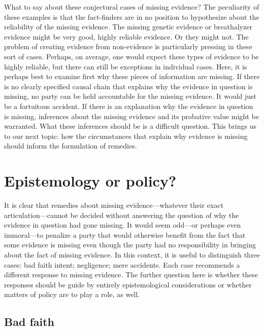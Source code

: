 \documentclass[
  10pt,
  dvipsnames,enabledeprecatedfontcommands]{scrartcl}
\begin{document}
What to say about these conjectural cases of missing evidence? The
peculiarity of these examples is that the fact-finders are in no
position to hypothesize about the reliability of the missing evidence.
The missing genetic evidence or breathalyzer evidence might be very
good, highly reliable evidence. Or they might not. The problem of
creating evidence from non-evidence is particularly pressing in these
sort of cases. Perhaps, on average, one would expect these types of
evidence to be highly reliable, but there can still be exceptions in
individual cases. Here, it is perhaps best to examine first why these
pieces of information are missing. If there is no clearly specified
causal chain that explains why the evidence in question is missing, no
party can be held accountable for the missing evidence. It would just be
a fortuitous accident. If there is an explanation why the evidence in
question is missing, inferences about the missing evidence and its
probative value might be warranted. What these inferences should be is a
difficult question. This brings us to our next topic: how the
circumstances that explain why evidence is missing should inform the
formulation of remedies.

\hypertarget{epistemology-or-policy}{%
\section{Epistemology or policy?}\label{epistemology-or-policy}}

It is clear that remedies about missing evidence---whatever their exact
articulation---cannot be decided without answering the question of why
the evidence in question had gone missing. It would seem odd---or
perhaps even immoral---to penalize a party that would otherwise benefit
from the fact that some evidence is missing even though the party had no
responsibility in bringing about the fact of missing evidence. In this
context, it is useful to distinguish three cases: bad faith intent;
negligence; mere accidents. Each case recommends a different response to
missing evidence. The further question here is whether these responses
should be guide by entirely epistemological considerations or whether
matters of policy are to play a role, as well.

\hypertarget{bad-faith}{%
\subsection{Bad faith}\label{bad-faith}}
\end{document}
